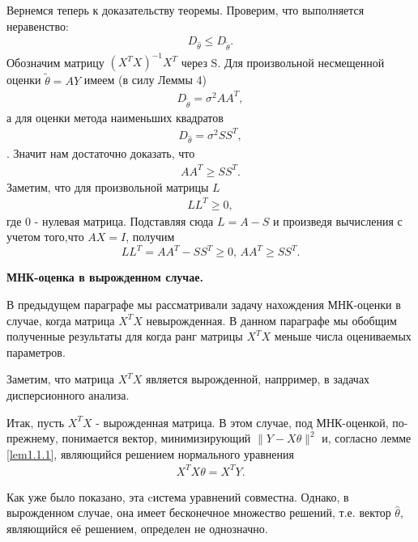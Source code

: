 \documentclass[10pt,slidestop,usepdftitle=false]{beamer}
\begin{document}
\begin{frame}
Вернемся теперь к доказательству
теоремы. 
Проверим, что выполняется неравенство:
\begin{eqnarray*}
D_{\widehat{\theta}}\leq D_{\widetilde{\theta}}.
\end{eqnarray*}
\pause
Обозначим матрицу $(X^TX)^{-1}X^T$ через S. Для произвольной
несмещенной оценки $\widetilde{\theta}=AY$ имеем (в силу Леммы 4)
\begin{eqnarray*}
D_{\widetilde{\theta}}=\sigma^2 AA^T,
\end{eqnarray*}
а для оценки метода наименьших квадратов
\begin{eqnarray*}
D_{\widehat{\theta}}=\sigma^2 SS^T,
\end{eqnarray*}.
Значит нам достаточно доказать, что 
\begin{eqnarray*}
AA^T\geq  SS^T.
\end{eqnarray*}
\pause
Заметим, что для произвольной матрицы $L$
\begin{eqnarray*}
LL^T\geq 0,
\end{eqnarray*}
где 0 - нулевая матрица.
Подставляя сюда $L= A-S$ и произведя вычисления с учетом того,что $AX=I$,
получим 
$$
LL^T= AA^T-SS^T\geq 0,\, AA^T\geq SS^T.
$$
\end{frame}
\begin{frame}
{\bf МНК-оценка в вырожденном случае.}

В предыдущем параграфе мы рассматривали задачу нахождения МНК-оценки
в случае, когда матрица $X^TX$ невырожденная. В данном параграфе мы
обобщим полученные результаты для 
когда ранг матрицы $X^TX$ меньше числа оцениваемых параметров. 
\bigskip
\pause

Заметим, что  матрица $X^TX$ является вырожденной, напрример,  в задачах дисперсионного анализа.
\bigskip
\pause

Итак, пусть $X^TX$ - вырожденная матрица. В этом случае, под
МНК-оценкой,
 по-прежнему, понимается вектор, минимизирующий $\|Y-X\theta \|^2$ и,
 согласно лемме \ref{lem1.1.1}, являющийся решением нормального уравнения
 \begin{eqnarray*}
X^TX\theta=X^TY.
\end{eqnarray*}
\bigskip
\pause

Как уже было показано, эта cистема уравнений совместна. Однако, в
вырожденном случае, она имеет бесконечное множество решений, т.е.
вектор $\widehat{\theta},$ являющийся её решением, определен не однозначно. 
\end{frame}
\end{document}
